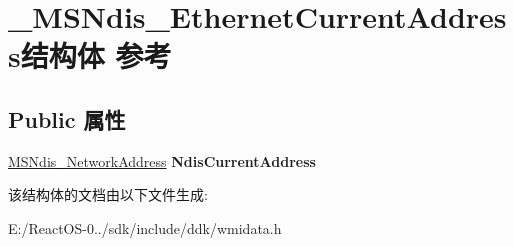 \hypertarget{struct___m_s_ndis___ethernet_current_address}{}\section{\+\_\+\+M\+S\+Ndis\+\_\+\+Ethernet\+Current\+Address结构体 参考}
\label{struct___m_s_ndis___ethernet_current_address}
\subsection*{Public 属性}
\begin{DoxyCompactItemize}
\item 
\mbox{\label{struct___m_s_ndis___ethernet_current_address_a1a192aaa83deda84e945d703b1d7d8d7}} 
\hyperlink{struct___m_s_ndis___network_address}{M\+S\+Ndis\+\_\+\+Network\+Address} {\bfseries Ndis\+Current\+Address}
\end{DoxyCompactItemize}


该结构体的文档由以下文件生成\+:\begin{DoxyCompactItemize}
\item 
E\+:/\+React\+O\+S-\/0../sdk/include/ddk/wmidata.\+h\end{DoxyCompactItemize}
